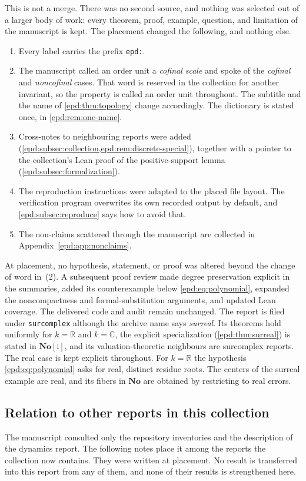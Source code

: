 \documentclass[11pt,a4paper]{article}
\numberwithin{equation}{section}
\theoremstyle{plain}
\theoremstyle{definition}
\theoremstyle{remark}
\newcommand{\No}{\mathbf{No}}
\newcommand{\R}{\mathbb R}
\newcommand{\C}{\mathbb C}
\begin{document}
This is not a merge. There was no second source, and nothing was selected
out of a larger body of work: every theorem, proof, example, question, and
limitation of the manuscript is kept. The placement changed the following,
and nothing else.
\begin{enumerate}[label=\textup{(\arabic*)},leftmargin=2em]
\item Every label carries the prefix \texttt{epd:}.
\item The manuscript called an order unit a \emph{cofinal scale} and spoke of
the \emph{cofinal} and \emph{noncofinal} cases. That word is reserved in
the collection for another invariant, so the property is called an order unit
throughout. The subtitle and the name of \cref{epd:thm:topology} change
accordingly. The dictionary is stated once, in \cref{epd:rem:one-name}.
\item Cross-notes to neighbouring reports were added
(\cref{epd:subsec:collection,epd:rem:discrete-special}), together with a
pointer to the collection's Lean proof of the positive-support lemma
(\cref{epd:subsec:formalization}).
\item The reproduction instructions were adapted to the placed file layout.
The verification program overwrites its own recorded output by default,
and \cref{epd:subsec:reproduce} says how to avoid that.
\item The non-claims scattered through the manuscript are collected in
Appendix~\ref{epd:app:nonclaims}.
\end{enumerate}
At placement, no hypothesis, statement, or proof was altered beyond the
change of word in~(2). A subsequent proof review made degree preservation
explicit in the summaries, added its counterexample below
\eqref{epd:eq:polynomial}, expanded the noncompactness and formal-substitution
arguments, and updated Lean coverage. The delivered code and audit remain
unchanged. The report is filed under \texttt{surcomplex} although the archive
name says \emph{surreal}. Its theorems hold uniformly for $k=\R$ and
$k=\C$, the explicit specialization (\cref{epd:thm:surreal}) is stated in
$\No[\mathrm i]$, and its valuation-theoretic neighbours are surcomplex
reports. The real case is kept explicit throughout. For $k=\R$ the
hypothesis \eqref{epd:eq:polynomial} asks for real, distinct residue
roots. The centers of the surreal example are real, and its fibers in
$\No$ are obtained by restricting to real errors.

\subsection{Relation to other reports in this collection}
\label{epd:subsec:collection}
The manuscript consulted only the repository inventories and the
description of the dynamics report. The following notes place it among the
reports the collection now contains. They were written at placement. No
result is transferred into this report from any of them, and none of
their results is strengthened here.
\end{document}
